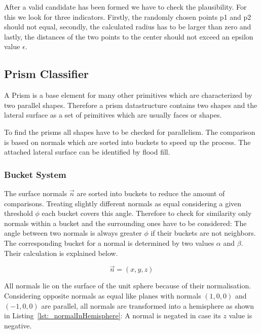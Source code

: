 \documentclass[../ClassicThesis.tex]{subfiles}
\begin{document}
After a valid candidate has been formed we have to check the plausibility. For this we look for three indicators. Firstly, the randomly chosen points p1 and p2 should not equal, secondly, the calculated radius has to be larger than zero and lastly, the distances of the two points to the center should not exceed an epsilon value $\epsilon$.




\subsection{Prism Classifier}
\label{ch:classifiers-prism}

A Prism is a base element for many other primitives which are characterized by two parallel shapes. Therefore a prism datastructure contains two shapes and the lateral surface as a set of primitives which are usually faces or shapes.

To find the prisms all shapes have to be checked for parallelism. The comparison is based on normals which are sorted into buckets to speed up the process. The attached lateral surface can be identified by flood fill.

\subsubsection{Bucket System}
\label{sec:PrismBucketSystem}

The surface normals $\vec{n}$ are sorted into buckets to reduce the amount of comparisons. Treating slightly different normals as equal considering a given threshold $\phi$ each bucket covers this angle. Therefore to check for similarity only normals within a bucket and the surrounding ones have to be considered: The angle between two normals is always greater $\phi$ if their buckets are not neighbors. The corresponding bucket for a normal is determined by two values $\alpha$ and $\beta$. Their calculation is explained below.

\begin{equation*}
    \vec{n} = (x, y, z)
\end{equation*}


All normals lie on the surface of the unit sphere because of their normalisation. Considering opposite normals as equal like planes with normals $(1,0,0)$ and $(-1,0,0)$ are parallel, all normals are transformed into a hemisphere as shown in Listing~\ref{lst:_normalInHemisphere}: A normal is negated in case its $z$ value is negative.
\end{document}
